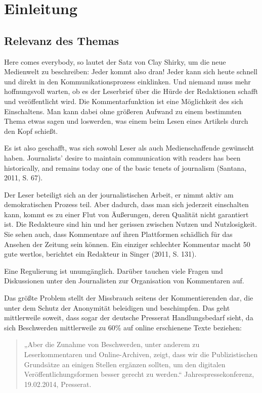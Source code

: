
\chapter{Einleitung}

\section{Relevanz des Themas}
\glqq Here comes everybody\grqq, so lautet der Satz von Clay Shirky, um die neue Medienwelt zu beschreiben:
Jeder kommt also dran! Jeder kann sich heute schnell und direkt in den Kommunikationsprozess einklinken.
Und niemand muss mehr hoffnungsvoll warten, ob es der 
Leserbrief über die Hürde der Redaktionen schafft und veröffentlicht wird. 
Die Kommentarfunktion ist eine Möglichkeit des sich \glqq Einschaltens\grqq. Man kann dabei ohne größeren Aufwand zu einem
bestimmten Thema etwas sagen und loswerden, was einem beim Lesen eines Artikels durch den Kopf schießt. 

Es ist also geschafft, was
sich sowohl Leser als auch Medienschaffende gewünscht haben. \glqq Journalists’ desire to 
maintain communication with readers has
been historically, and remains today one of the basic tenets of journalism\grqq\- (Santana, 2011, S. 67).

Der Leser beteiligt sich an der journalistischen Arbeit, er nimmt
aktiv am demokratischen Prozess teil.
Aber dadurch, dass man sich jederzeit einschalten kann, kommt es zu
einer Flut von Äußerungen, deren Qualität nicht garantiert ist. Die Redakteure
sind hin und her gerissen zwischen Nutzen und Nutzlosigkeit. Sie sehen auch, 
dass Kommentare auf ihren Plattformen schädlich für das Ansehen der Zeitung sein können. 
Ein einziger \glqq schlechter\grqq\- Kommentar macht 50 gute wertlos, berichtet ein Redakteur in Singer (2011, S. 131).




Eine Regulierung ist unumgänglich. Darüber tauchen viele Fragen und Diskussionen unter den
Journalisten zur Organisation von Kommentaren auf.

Das größte Problem stellt der Missbrauch seitens der Kommentierenden dar, die unter dem Schutz
der Anonymität beleidigen und beschimpfen. Das geht mittlerweile soweit, dass
sogar der deutsche Presserat Handlungsbedarf sieht, da sich Beschwerden
mittlerweile zu 60\% auf online erschienene Texte beziehen:

\begin{quote}
„Aber die Zunahme
von Beschwerden, unter anderem zu Leserkommentaren und Online-Archiven, zeigt,
dass wir die Publizistischen Grundsätze an einigen Stellen ergänzen sollten, um
den digitalen Ver\-öffentlichungs\-for\-men besser gerecht zu werden.“
Jahrespressekonferenz, 19.02.2014, Presserat. 
\end{quote}


